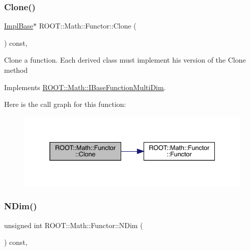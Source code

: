 \subsubsection{\texorpdfstring{Clone()}{Clone()}\hspace{0.1cm}{\footnotesize\ttfamily [2/2]}}
{\footnotesize\ttfamily \mbox{\hyperlink{classROOT_1_1Math_1_1Functor_acc5dacb213f26296122e95138f5153b3}{Impl\+Base}}$\ast$ R\+O\+O\+T\+::\+Math\+::\+Functor\+::\+Clone (\begin{DoxyParamCaption}{ }\end{DoxyParamCaption}) const\hspace{0.3cm}{\ttfamily [inline]}, {\ttfamily [virtual]}}

Clone a function. Each derived class must implement his version of the Clone method 

Implements \mbox{\hyperlink{classROOT_1_1Math_1_1IBaseFunctionMultiDim_a57939204b1f525b43835b42e0635dd3b}{R\+O\+O\+T\+::\+Math\+::\+I\+Base\+Function\+Multi\+Dim}}.

Here is the call graph for this function\+:
\nopagebreak
\begin{figure}[H]
\begin{center}
\leavevmode
\includegraphics[width=338pt]{da/d8e/classROOT_1_1Math_1_1Functor_a989f9b6dd160ebe03911cdee00dacaad_cgraph}
\end{center}
\end{figure}
\mbox{\label{classROOT_1_1Math_1_1Functor_a2544e2ed3c6a0420084c7b08eb3c3130}} 
\subsubsection{\texorpdfstring{NDim()}{NDim()}\hspace{0.1cm}{\footnotesize\ttfamily [1/2]}}
{\footnotesize\ttfamily unsigned int R\+O\+O\+T\+::\+Math\+::\+Functor\+::\+N\+Dim (\begin{DoxyParamCaption}{ }\end{DoxyParamCaption}) const\hspace{0.3cm}{\ttfamily [inline]}, {\ttfamily [virtual]}}

